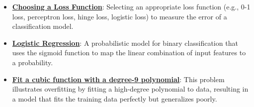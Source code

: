 \documentclass{article}%
\begin{document}
\begin{itemize}[leftmargin=*]
\item \href{https://purdue.brightspace.com/d2l/common/assets/pdfjs-d2l-dist/1.0.14-legacy/web/viewer.html?file=\%2Fcontent\%2Fenforced\%2F1095467-wl.202510.CS.24300.001\%2F05L2-ML Basics.pdf\%3Fou\%3D1095467\&lang=en-us\&container=d2l-fileviewer-rendered-pdf\&fullscreen=d2l-fileviewer-rendered-pdf-dialog\&height=667#page=25}{\textbf{Choosing a Loss Function}}: Selecting an appropriate loss function (e.g., 0-1 loss, perceptron loss, hinge loss, logistic loss) to measure the error of a classification model.%
\item \href{https://purdue.brightspace.com/d2l/common/assets/pdfjs-d2l-dist/1.0.14-legacy/web/viewer.html?file=\%2Fcontent\%2Fenforced\%2F1095467-wl.202510.CS.24300.001\%2F05L2-ML Basics.pdf\%3Fou\%3D1095467\&lang=en-us\&container=d2l-fileviewer-rendered-pdf\&fullscreen=d2l-fileviewer-rendered-pdf-dialog\&height=667#page=31}{\textbf{Logistic Regression}}: A probabilistic model for binary classification that uses the sigmoid function to map the linear combination of input features to a probability.%
\item \href{https://purdue.brightspace.com/d2l/common/assets/pdfjs-d2l-dist/1.0.14-legacy/web/viewer.html?file=\%2Fcontent\%2Fenforced\%2F1095467-wl.202510.CS.24300.001\%2F10L1-CrossValidation.pdf\%3Fou\%3D1095467\&lang=en-us\&container=d2l-fileviewer-rendered-pdf\&fullscreen=d2l-fileviewer-rendered-pdf-dialog\&height=667#page=15}{\textbf{Fit a cubic function with a degree-9 polynomial}}: This problem illustrates overfitting by fitting a high-degree polynomial to data, resulting in a model that fits the training data perfectly but generalizes poorly.%
\end{itemize}

%
\end{document}
